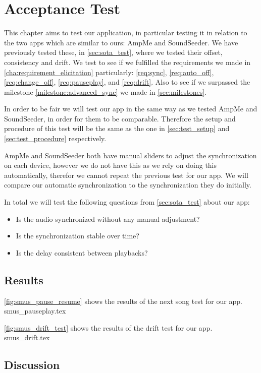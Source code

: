 \chapter{Acceptance Test}\label{cha:acctest}
This chapter aims to test our application, in particular testing it in relation to the two apps which are similar to ours: AmpMe and SoundSeeder.
We have previously tested these, in \vref{sec:sota_test}, where we tested their offset, consistency and drift.
We test to see if we fulfilled the requirements we made in \vref{cha:requirement_elicitation} particularly: \ref{req:sync}, \ref{req:auto_off}, \ref{req:change_off}, \ref{req:pauseplay}, and \ref{req:drift}.
Also to see if we surpassed the milestone \ref{milestone:advanced_sync} we made in \vref{sec:milestones}.

In order to be fair we will test our app in the same way as we tested AmpMe and SoundSeeder, in order for them to be comparable.
Therefore the setup and procedure of this test will be the same as the one in \vref{sec:test_setup} and \vref{sec:test_procedure} respectively.

AmpMe and SoundSeeder both have manual sliders to adjust the synchronization on each device, however we do not have this as we rely on doing this automatically, therefor we cannot repeat the previous test for our app.
We will compare our automatic synchronization to the synchronization they do initially.

In total we will test the following questions from \vref{sec:sota_test} about our app:
\begin{itemize}
    \item Is the audio synchronized without any manual adjustment?
    \item Is the synchronization stable over time?
    \item Is the delay consistent between playbacks?
\end{itemize}

\section{Results}

\vref{fig:smus_pause_resume} shows the results of the next song test for our app.
{smus_pauseplay.tex}

\vref{fig:smus_drift_test} shows the results of the drift test for our app.
{smus_drift.tex}

\section{Discussion}

